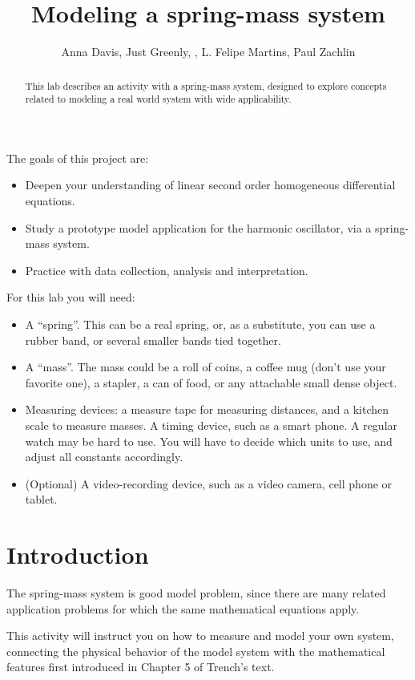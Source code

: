 \documentclass{ximera}
\title{Modeling a spring-mass system}
\author{Anna Davis, Just Greenly, , L. Felipe Martins, Paul Zachlin}
\begin{document}
\begin{abstract}
This lab describes an activity with a spring-mass system, designed to explore concepts related to modeling a real world system with wide applicability.
\end{abstract}


\maketitle

The goals of this project are:
\begin{itemize}
    \item Deepen your understanding of linear second order homogeneous differential equations.
    \item Study a prototype model application for the harmonic oscillator, via a spring-mass system.
    \item Practice with data collection, analysis and interpretation.
\end{itemize}

For this lab you will need:
\begin{itemize}
    \item A ``spring''. This can be a real spring, or, as a substitute, you can use a rubber band, or several smaller bands tied together.
    \item A ``mass''. The mass could be a roll of coins, a coffee mug (don’t use your favorite one), a stapler, a can of food, or any attachable small dense object.
    \item Measuring devices: a measure tape for measuring distances, and a kitchen scale to measure masses. A timing device, such as a smart phone. A regular watch may be hard to use. You will have to decide which units to use, and adjust all constants accordingly.
    \item (Optional) A video-recording device, such as a video camera, cell phone or tablet.
\end{itemize}

\section{Introduction}

The spring-mass system is good model problem, since there are many related application problems for which the same mathematical equations apply.  

This activity will instruct you on how to measure and model your own system, connecting the physical behavior of the model system with the mathematical features first introduced in Chapter 5 of Trench’s text.
\end{document}
